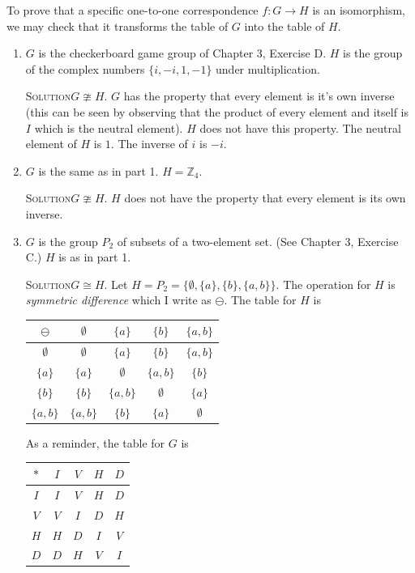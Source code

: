 \documentclass[twoside]{amsart}
\newcommand{\solution}{\textsc{Solution}\xspace}
\newcommand{\iso}{\cong}
\newcommand{\niso}{\ncong}
\newcommand{\blank}{\vspace{5pt}}
\begin{document}
\begin{enumerate}[A.]
   To prove that a specific one-to-one correspondence $f:G \to H$ is an
   isomorphism, we may check that it transforms the table of $G$ into
   the table of $H$.

   \begin{enumerate}[1]
      \item $G$ is the checkerboard game group of Chapter 3, Exercise D.
      $H$ is the group of the complex numbers $\{i, -i, 1, -1\}$ under
      multiplication.

      \blank \noindent \solution $G \niso H$. $G$ has the property 
      that every element is it's own inverse (this can be seen by observing
      that the product of every element and itself is $I$ which is the
      neutral element). $H$ does not have this property.
      The neutral element of $H$ is $1$. The inverse of $i$ is $-i$.

      \blank
      \item $G$ is the same as in part 1. $H=\mathbb{Z}_4$.

      \blank \noindent \solution $G \niso H$. $H$ does not have
      the property that every element is its own inverse.

      \blank
      \item $G$ is the group $P_2$ of subsets of a two-element set. (See
      Chapter 3, Exercise C.) $H$ is as in part 1.

      \blank\noindent\solution $G \iso H$. Let $H = P_2 = \{\emptyset,
      \{a\}, \{b\}, \{a,b\}\}$. The operation for $H$ is 
      \emph{symmetric difference} which I write as $\ominus$.
      The table for $H$ is

      \blank
      \begin{center}
      \begin{tabular}{c|cccc}
         $\ominus$   & $\emptyset$ & $\{a\}$ & $\{b\}$ & $\{a,b\}$ \\ \hline
         $\emptyset$ & $\emptyset$ & $\{a\}$ & $\{b\}$ & $\{a,b\}$ \\ 
         $\{a\}$     & $\{a\}$ & $\emptyset$ & $\{a,b\}$ & $\{b\}$ \\
         $\{b\}$     & $\{b\}$ & $\{a,b\}$ & $\emptyset$ & $\{a\}$ \\
         $\{a,b\}$   & $\{a,b\}$ & $\{b\}$ & $\{a\}$ & $\emptyset$
      \end{tabular}
      \end{center}
      \blank

      As a reminder, the table for $G$ is
      \blank
      \begin{center}
      \begin{tabular}{c|cccc}
         $*$ & $I$ & $V$ & $H$ & $D$ \\ \hline
         $I$ & $I$ & $V$ & $H$ & $D$ \\
         $V$ & $V$ & $I$ & $D$ & $H$ \\
         $H$ & $H$ & $D$ & $I$ & $V$ \\
         $D$ & $D$ & $H$ & $V$ & $I$
      \end{tabular}
      \end{center}
      \blank


\end{enumerate}
\end{enumerate}
\end{document}

